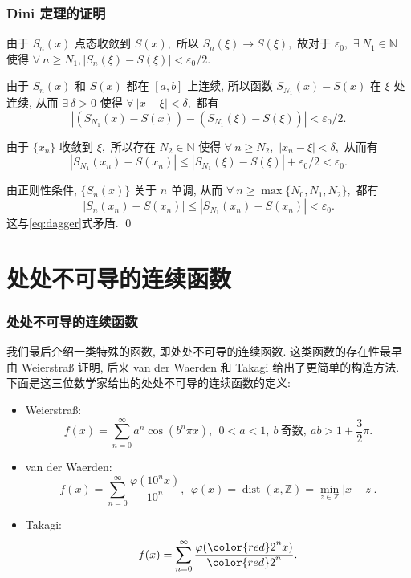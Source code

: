 
\begin{frame}
\frametitle{Dini 定理的证明}

由于 $S_n(x)$ 点态收敛到 $S(x),$ 所以 $S_n(\xi) \to S(\xi),$ 故对于 $\varepsilon_0,$ $\exists ~ N_1 \in \mathbb{N}$ 使得 $\forall ~ n \geqslant N_1, |S_n(\xi) - S(\xi)| < \varepsilon_0/2.$

\pause
\vspace{0.5em}

由于 $S_n(x)$ 和 $S(x)$ 都在 $[a, b]$ 上连续, 所以函数 $S_{N_1}(x) - S(x)$ 在 $\xi$ 处连续, 从而 $\exists ~ \delta > 0$ 使得 $\forall ~ |x - \xi| < \delta,$ 都有
\[
\left| (S_{N_1}(x) - S(x)) - (S_{N_1}(\xi) - S(\xi)) \right| < \varepsilon_0/2.
\]

\pause
\vspace{0.5em}

由于 $\{x_n\}$ 收敛到 $\xi,$ 所以存在 $N_2 \in \mathbb{N}$ 使得 $\forall ~ n \geqslant N_2,$ $|x_n - \xi| < \delta,$ 从而有
\[
\left| S_{N_1}(x_n) - S(x_n) \right| \leqslant \left| S_{N_1}(\xi) - S(\xi) \right| + \varepsilon_0/2 < \varepsilon_0.
\]

\pause
\vspace{0.5em}

由正则性条件, $\{S_n(x)\}$ 关于 $n$ 单调, 从而 $\forall ~ n \geqslant \max\{N_0, N_1, N_2\},$ 都有
\[
\left| S_n(x_n) - S(x_n) \right| \leqslant \left| S_{N_1}(x_n) - S(x_n) \right| < \varepsilon_0.
\]
这与\eqref{eq:dagger}式矛盾.
\qed

\end{frame}


\section{处处不可导的连续函数}


\begin{frame}
\frametitle{处处不可导的连续函数}

我们最后介绍一类特殊的函数, 即\alert{处处不可导的连续函数}. 这类函数的存在性最早由 Weierstraß 证明, 后来 van der Waerden 和 Takagi 给出了更简单的构造方法. 下面是这三位数学家给出的处处不可导的连续函数的定义:

\begin{itemize}[<+->]
\item Weierstraß:
\[f(x) = \sum_{n=0}^\infty a^n \cos(b^n\pi x), ~~ 0 < a < 1, ~ b ~ \text{奇数}, ~ ab > 1 + \frac{3}{2}\pi.\]
\item van der Waerden:
\[f(x) = \sum_{n=0}^\infty \dfrac{\varphi(10^n x)}{10^n}, ~~ \varphi(x) = \operatorname{dist}(x, \mathbb{Z}) = \min_{z \in \mathbb{Z}} | x - z |.\]
\item Takagi:
\[f(x) = \sum_{n=0}^\infty \dfrac{\varphi({\color{red}2}^n x)}{{\color{red}2}^n}.\]
\end{itemize}

\end{frame}

